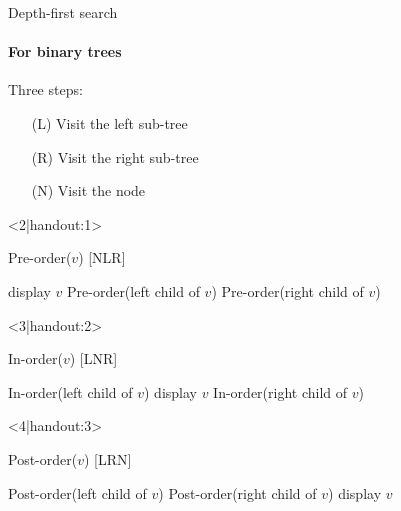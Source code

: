 \documentclass[handout]{beamer}
\begin{document}
\begin{frame}[fragile]{Depth-first search}
  \framesubtitle{For binary trees}
  
  \begin{overlayarea}{\textwidth}{\textheight}
  \begin{block}{}
    Three steps:
    \begin{itemize}
      \item[(L)] Visit the left sub-tree
      \item[(R)] Visit the right sub-tree
      \item[(N)] Visit the node
    \end{itemize}
  \end{block}
  
  \begin{onlyenv}<2|handout:1>
  \begin{code}{Pre-order($v$) [NLR]}
    \begin{PseudoCode}
display $v$
Pre-order(left child of $v$)
Pre-order(right child of $v$)
    \end{PseudoCode}
  \end{code}
  \end{onlyenv}
  
  \begin{onlyenv}<3|handout:2>
  \begin{code}{In-order($v$) [LNR]}
    \begin{PseudoCode}
In-order(left child of $v$)
display $v$
In-order(right child of $v$)
    \end{PseudoCode}
  \end{code}  
  \end{onlyenv}
  
  \begin{onlyenv}<4|handout:3>
  \begin{code}{Post-order($v$)  [LRN]}
    \begin{PseudoCode}
Post-order(left child of $v$)
Post-order(right child of $v$)
display $v$
    \end{PseudoCode}
  \end{code}  
  \end{onlyenv}
   \end{overlayarea}
\end{frame}
\end{document}
